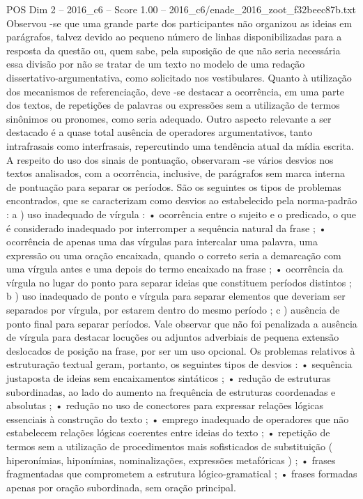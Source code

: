 \begin{textsample}{POS Dim 2 – 2016\_c6 – Score 1.00 – 2016\_c6/enade\_2016\_zoot\_f32beec87b.txt}
Observou -se que uma grande parte dos participantes não organizou as ideias em parágrafos, talvez devido ao pequeno número de linhas disponibilizadas para a resposta da questão ou, quem sabe, pela suposição de que não seria necessária essa divisão por não se tratar de um texto no modelo de uma redação dissertativo-argumentativa, como solicitado nos vestibulares.
Quanto à utilização dos mecanismos de referenciação, deve -se destacar a ocorrência, em uma parte dos textos, de repetições de palavras ou expressões sem a utilização de termos sinônimos ou pronomes, como seria adequado.
Outro aspecto relevante a ser destacado é a quase total ausência de operadores argumentativos, tanto intrafrasais como interfrasais, repercutindo uma tendência atual da mídia escrita.
A respeito do uso dos sinais de pontuação, observaram -se vários desvios nos textos analisados, com a ocorrência, inclusive, de parágrafos sem marca interna de pontuação para separar os períodos.
São os seguintes os tipos de problemas encontrados, que se caracterizam como desvios ao estabelecido pela norma-padrão : a ) uso inadequado de vírgula : • ocorrência entre o sujeito e o predicado, o que é considerado inadequado por interromper a sequência natural da frase ; • ocorrência de apenas uma das vírgulas para intercalar uma palavra, uma expressão ou uma oração encaixada, quando o correto seria a demarcação com uma vírgula antes e uma depois do termo encaixado na frase ; • ocorrência da vírgula no lugar do ponto para separar ideias que constituem períodos distintos ; b ) uso inadequado de ponto e vírgula para separar elementos que deveriam ser separados por vírgula, por estarem dentro do mesmo período ; c ) ausência de ponto final para separar períodos.
Vale observar que não foi penalizada a ausência de vírgula para destacar locuções ou adjuntos adverbiais de pequena extensão deslocados de posição na frase, por ser um uso opcional.
Os problemas relativos à estruturação textual geram, portanto, os seguintes tipos de desvios : • sequência justaposta de ideias sem encaixamentos sintáticos ; • redução de estruturas subordinadas, ao lado do aumento na frequência de estruturas coordenadas e absolutas ; • redução no uso de conectores para expressar relações lógicas essenciais à construção do texto ; • emprego inadequado de operadores que não estabelecem relações lógicas coerentes entre ideias do texto ; • repetição de termos sem a utilização de procedimentos mais sofisticados de substituição ( hiperonímias, hiponímias, nominalizações, expressões metafóricas ) ; • frases fragmentadas que comprometem a estrutura lógico-gramatical ; • frases formadas apenas por oração subordinada, sem oração principal.

\end{textsample}
